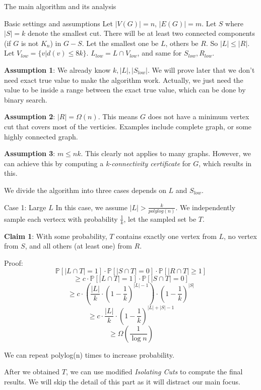 \documentclass{article}
\begin{document}
\begin{section}{The main algorithm and its analysis}
  \begin{subsection}{Basic settings and assumptions}
    Let $|V(G)| = n$, $|E(G)| = m$. Let $S$ where $|S| = k$ denote the smallest cut. There will be at least two connected components (if $G$ is not $K_n$) in $G - S$. Let the smallest one be $L$, others be $R$. So $|L| \leq |R|$. Let $V_{low} = \{v | d(v) \leq 8k\}$. $L_{low} = L \cap V_{low}$, and same for $S_{low}, R_{low}$. 

    \textbf{Assumption 1}: We already know $k, |L|, |S_{low}|$. We will prove later that we don't need exact true value to make the algorithm work. Actually, we just need the value to be inside a range between the exact true value, which can be done by binary search.

    \textbf{Assumption 2}: $|R| = \Omega(n)$. This means $G$ does not have a minimum vertex cut that covers most of the verticies. Examples include complete graph, or some highly connected graph. 

    \textbf{Assumption 3}: $m \leq nk$. This clearly not applies to many graphs. However, we can achieve this by computing a \textit{k-connectivity certificate} \cite{nagamochi_ibaraki} for $G$, which results in this. 

    We divide the algorithm into three cases depends on $L$ and $S_{low}$. 
  \end{subsection}

  \begin{subsection}{Case 1: Large $L$}
    In this case, we assume $|L| > \frac{k}{polylog(n)}$. We independently sample each vertecx with probability $\frac1k$, let the sampled set be $T$. 

    \textbf{Claim 1}: With some probability, $T$ contains exactly one vertex from $L$, no vertex from $S$, and all others (at least one) from $R$. 

    Proof: $$\mathbb{P}[|L \cap T| = 1] \cdot \mathbb{P}[|S \cap T| = 0] \cdot \mathbb{P}[|R \cap T| \geq 1]$$
    $$ \geq c \cdot \mathbb{P}[|L \cap T| = 1] \cdot \mathbb{P}[|S \cap T| = 0]$$
    $$ \geq c \cdot (\frac{|L|}{k} \cdot (1 - \frac1k)^{|L| - 1}) \cdot (1 - \frac1k)^{|S|}$$
    $$ \geq c \cdot \frac{|L|}{k} \cdot (1 - \frac1k)^{|L| + |S| - 1}$$
    $$ \geq \Omega(\frac{1}{\log n})$$

    We can repeat polylog(n) times to increase probability. 

    After we obtained $T$, we can use modified \textit{Isolating Cuts} \cite{chekuri_quanrud} to compute the final results. We will skip the detail of this part as it will distract our main focus. 
  \end{subsection}


\end{section}
\end{document}
